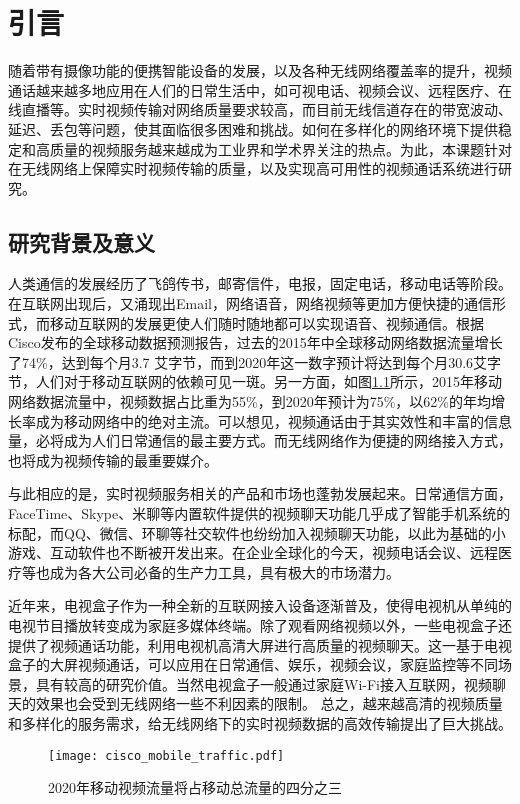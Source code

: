 \chapter{引言}
\label{chap:intro}
随着带有摄像功能的便携智能设备的发展，以及各种无线网络覆盖率的提升，视频通话越来越多地应用在人们的日常生活中，如可视电话、视频会议、远程医疗、在线直播等。实时视频传输对网络质量要求较高，而目前无线信道存在的带宽波动、延迟、丢包等问题，使其面临很多困难和挑战。如何在多样化的网络环境下提供稳定和高质量的视频服务越来越成为工业界和学术界关注的热点。为此，本课题针对在无线网络上保障实时视频传输的质量，以及实现高可用性的视频通话系统进行研究。

\section{研究背景及意义}
人类通信的发展经历了飞鸽传书，邮寄信件，电报，固定电话，移动电话等阶段。在互联网出现后，又涌现出Email，网络语音，网络视频等更加方便快捷的通信形式，而移动互联网的发展更使人们随时随地都可以实现语音、视频通信。根据Cisco发布的全球移动数据预测报告\cite{index2016global}，过去的2015年中全球移动网络数据流量增长了74\%，达到每个月3.7 艾字节，而到2020年这一数字预计将达到每个月30.6艾字节，人们对于移动互联网的依赖可见一斑。另一方面，如图\ref{fig:cisco_mobile}所示，2015年移动网络数据流量中，视频数据占比重为55\%，到2020年预计为75\%，以62\%的年均增长率成为移动网络中的绝对主流。可以想见，视频通话由于其实效性和丰富的信息量，必将成为人们日常通信的最主要方式。而无线网络作为便捷的网络接入方式，也将成为视频传输的最重要媒介。

与此相应的是，实时视频服务相关的产品和市场也蓬勃发展起来。日常通信方面，FaceTime、Skype、米聊等内置软件提供的视频聊天功能几乎成了智能手机系统的标配，而QQ、微信、环聊等社交软件也纷纷加入视频聊天功能，以此为基础的小游戏、互动软件也不断被开发出来。在企业全球化的今天，视频电话会议、远程医疗等也成为各大公司必备的生产力工具，具有极大的市场潜力。

近年来，电视盒子作为一种全新的互联网接入设备逐渐普及，使得电视机从单纯的电视节目播放转变成为家庭多媒体终端。除了观看网络视频以外，一些电视盒子还提供了视频通话功能，利用电视机高清大屏进行高质量的视频聊天。这一基于电视盒子的大屏视频通话，可以应用在日常通信、娱乐，视频会议，家庭监控等不同场景，具有较高的研究价值。当然电视盒子一般通过家庭Wi-Fi接入互联网，视频聊天的效果也会受到无线网络一些不利因素的限制。
总之，越来越高清的视频质量和多样化的服务需求，给无线网络下的实时视频数据的高效传输提出了巨大挑战。

\begin{figure}[htbp]
  \centering
  \texttt{[image: cisco\_mobile\_traffic.pdf]}
  \caption{2020年移动视频流量将占移动总流量的四分之三}
  \label{fig:cisco_mobile}
\end{figure}

